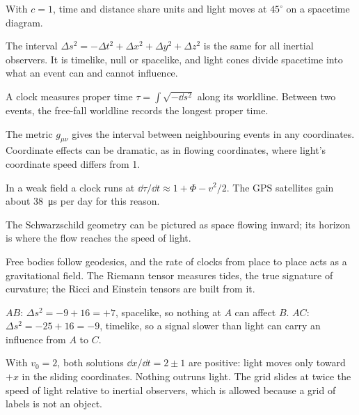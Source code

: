 \begin{chaptersummary}
\item With $c = 1$, time and distance share units and light moves at
  $45^{\circ}$ on a spacetime diagram.
\item The interval $\Delta s^{2} = -\Delta t^{2} + \Delta x^{2} + \Delta y^{2} + \Delta z^{2}$
  is the same for all inertial observers. It is timelike, null or spacelike,
  and light cones divide spacetime into what an event can and cannot
  influence.
\item A clock measures proper time $\tau = \int\sqrt{-\dd s^{2}}$ along its
  worldline. Between two events, the free-fall worldline records the longest
  proper time.
\item The metric $g_{\mu\nu}$ gives the interval between neighbouring events in
  any coordinates. Coordinate effects can be dramatic, as in flowing
  coordinates, where light's coordinate speed differs from 1.
\item In a weak field a clock runs at $\dd\tau/\dd t \approx 1 + \Phi - v^{2}/2$. The
  GPS satellites gain about \SI{38}{\micro\second} per day for this reason.
\item The Schwarzschild geometry can be pictured as space flowing inward; its
  horizon is where the flow reaches the speed of light.
\item Free bodies follow geodesics, and the rate of clocks from place to place
  acts as a gravitational field. The Riemann tensor measures tides, the true
  signature of curvature; the Ricci and Einstein tensors are built from it.
\end{chaptersummary}

\begin{checkanswers}
\item[2.1] $AB$: $\Delta s^{2} = -9 + 16 = +7$, spacelike, so nothing at $A$ can
  affect $B$. $AC$: $\Delta s^{2} = -25 + 16 = -9$, timelike, so a signal slower
  than light can carry an influence from $A$ to $C$.
\item[2.2] With $v_{0} = 2$, both solutions $\dd x/\dd t = 2 \pm 1$ are positive:
  light moves only toward $+x$ in the sliding coordinates. Nothing outruns
  light. The grid slides at twice the speed of light relative to inertial
  observers, which is allowed because a grid of labels is not an object.
\end{checkanswers}


